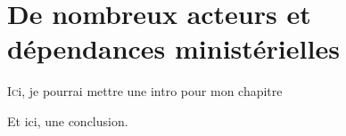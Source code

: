 \chapter[Acteurs et dépendances]{\label{I-B}De nombreux acteurs et dépendances ministérielles }


\lettrine{I}ci, je pourrai mettre une intro pour mon chapitre






\bigskip
\bigskip
\bigskip

Et ici, une conclusion.

